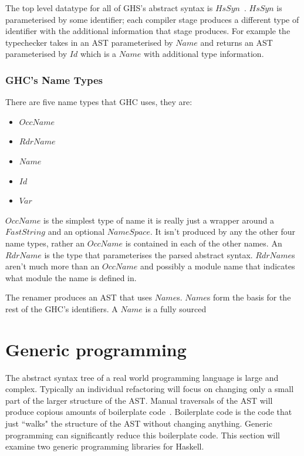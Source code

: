 The top level datatype for all of GHS's abstract syntax is $HsSyn$~\citep{ghcDesign}. $HsSyn$ is parameterised by some identifier; each compiler stage produces a different type of identifier with the additional information that stage produces. For example the typechecker takes in an AST parameterised by $Name$ and returns an AST parameterised by $Id$ which is a $Name$ with additional type information.

\subsubsection{GHC's Name Types}

There are five name types that GHC uses, they are:

\begin{itemize}
	\item $OccName$
	\item $RdrName$
	\item $Name$
	\item $Id$
	\item $Var$
\end{itemize}

$OccName$ is the simplest type of name it is really just a wrapper around a $FastString$ and an optional $NameSpace$. It isn't produced by any the other four name types, rather an $OccName$ is contained in each of the other names. An $RdrName$ is the type that parameterises the parsed abstract  syntax. $RdrName$s aren't much more than an $OccName$ and possibly a module name that indicates what module the name is defined in.

The renamer produces an AST that uses $Name$s. $Name$s form the basis for the rest of the GHC's identifiers. A $Name$ is a fully sourced 


\section{Generic programming}
The abstract syntax tree of a real world programming language is large and complex. Typically an individual refactoring will focus on changing only a small part of the larger structure of the AST. Manual traversals of the AST will produce copious amounts of boilerplate code~\citep{syb}. Boilerplate code is the code that just ``walks" the structure of the AST without changing anything. Generic programming can significantly reduce this boilerplate code\citep{syb,uniplate}. This section will examine two generic programming libraries for Haskell.

